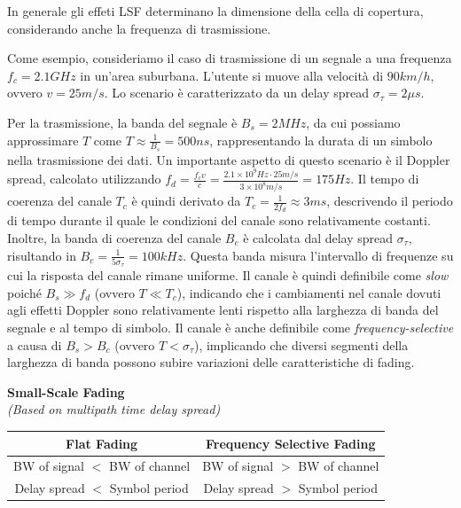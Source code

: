 In generale gli effeti LSF determinano la dimensione della cella di copertura, considerando anche la frequenza di trasmissione.


Come esempio, consideriamo il caso di trasmissione di un segnale a una frequenza \( f_c = 2.1 \si{GHz} \) in un'area suburbana. L'utente si muove alla velocità di $90 \si{km/h}$, ovvero \( v = 25 \si{m/s} \). Lo scenario è caratterizzato da un delay spread \( \sigma_\tau = 2 \si{\mu s} \).

Per la trasmissione, la banda del segnale è \( B_s = 2 \si{MHz} \), da cui possiamo approssimare \( T \) come \( T \approx \frac{1}{B_s} = 500 \si{ns} \), rappresentando la durata di un simbolo nella trasmissione dei dati.
Un importante aspetto di questo scenario è il Doppler spread, calcolato utilizzando \( f_d = \frac{f_c v}{c} = \frac{2.1 \times 10 ^9 \si{Hz} \cdot 25 \si{m/s}}{3 \times 10^8 \si{m/s}} = 175\si{Hz}\).
Il tempo di coerenza del canale \( T_c \) è quindi derivato da \( T_c = \frac{1}{2f_d} \approx 3 \si{ms}\), descrivendo il periodo di tempo durante il quale le condizioni del canale sono relativamente costanti.
Inoltre, la banda di coerenza del canale \( B_c \) è calcolata dal delay spread \( \sigma_\tau \), risultando in \( B_c = \frac{1}{5\sigma_\tau} = 100 \si{kHz} \). Questa banda misura l'intervallo di frequenze su cui la risposta del canale rimane uniforme.
Il canale è quindi definibile come \textit{slow} poiché \( B_s \gg f_d \) (ovvero \( T \ll T_c \)), indicando che i cambiamenti nel canale dovuti agli effetti Doppler sono relativamente lenti rispetto alla larghezza di banda del segnale e al tempo di simbolo.
Il canale è anche definibile come \textit{frequency-selective} a causa di \( B_s > B_c \) (ovvero \( T < \sigma_\tau \)), implicando che diversi segmenti della larghezza di banda possono subire variazioni delle caratteristiche di fading.







\begin{center}
\textbf{Small-Scale Fading} \\
\textit{(Based on multipath time delay spread)}

\bigskip

\begin{tabular}{|c|c|}
\hline
\textbf{Flat Fading} & \textbf{Frequency Selective Fading} \\ \hline
BW of signal $<$ BW of channel & BW of signal $>$ BW of channel \\
Delay spread $<$ Symbol period & Delay spread $>$ Symbol period \\ \hline
\end{tabular}
\end{center}



